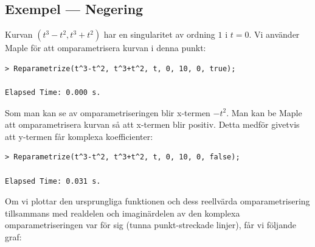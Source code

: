 \subsection{Exempel --- Negering}

Kurvan $\left(t^3 - t^2,t^3 + t^2\right)$ har en singularitet av ordning $1$ i $t = 0$. Vi använder Maple för att omparametrisera kurvan i denna punkt:

\begin{maplegroup}
\begin{verbatim}
> Reparametrize(t^3-t^2, t^3+t^2, t, 0, 10, 0, true);

Elapsed Time: 0.000 s.
\end{verbatim}
\mapleresult
\begin{maplelatex}
\end{maplelatex}
\end{maplegroup}

\vspace{20pt}
Som man kan se av omparametriseringen blir x-termen $-t^2$. Man kan be Maple att omparametrisera kurvan så att x-termen blir positiv. Detta
medför givetvis att y-termen får komplexa koefficienter:

\begin{maplegroup}
\begin{verbatim}
> Reparametrize(t^3-t^2, t^3+t^2, t, 0, 10, 0, false);

Elapsed Time: 0.031 s.
\end{verbatim}
\mapleresult
\begin{maplelatex}
\end{maplelatex}
\end{maplegroup}

\vspace{20pt}
Om vi plottar den ursprungliga funktionen och dess reellvärda omparametrisering tillsammans med realdelen och imaginärdelen av den komplexa omparametriseringen var för sig (tunna punkt-streckade linjer), får vi följande graf:

